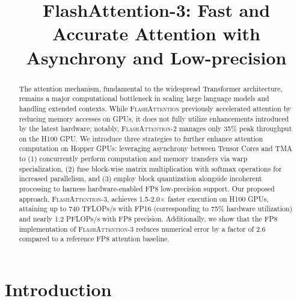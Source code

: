 \title{FlashAttention-3: Fast and Accurate Attention with Asynchrony and Low-precision}

\begin{abstract}
The attention mechanism, fundamental to the widespread Transformer architecture, remains a major computational bottleneck in scaling large language models and handling extended contexts. While \textsc{FlashAttention} previously accelerated attention by reducing memory accesses on GPUs, it does not fully utilize enhancements introduced by the latest hardware; notably, \textsc{FlashAttention-2} manages only 35\% peak throughput on the H100 GPU. We introduce three strategies to further enhance attention computation on Hopper GPUs: leveraging asynchrony between Tensor Cores and TMA to (1) concurrently perform computation and memory transfers via warp specialization, (2) fuse block-wise matrix multiplication with softmax operations for increased parallelism, and (3) employ block quantization alongside incoherent processing to harness hardware-enabled FP8 low-precision support. Our proposed approach, \textsc{FlashAttention-3}, achieves 1.5-2.0$\times$ faster execution on H100 GPUs, attaining up to 740 TFLOPs/s with FP16 (corresponding to 75\% hardware utilization) and nearly 1.2 PFLOPs/s with FP8 precision. Additionally, we show that the FP8 implementation of \textsc{FlashAttention-3} reduces numerical error by a factor of 2.6 compared to a reference FP8 attention baseline.
\end{abstract}

\section{Introduction}
\label{sec:intro}

